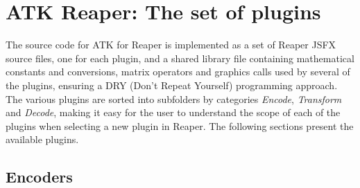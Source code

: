 \documentclass{article}
\begin{document}
\section{ATK Reaper: The set of plugins}\label{sec:implementation}

The source code for ATK for Reaper is implemented as a set of Reaper JSFX source files, one for each plugin, and a shared library file containing mathematical constants and conversions, matrix operators and graphics calls used by several of the plugins, ensuring a DRY (Don't Repeat Yourself) programming approach.
The various plugins are sorted into subfolders by categories \emph{Encode}, \emph{Transform} and \emph{Decode}, making it easy for the user to understand the scope of each of the plugins when selecting a new plugin in Rea\-per. 
The following sections present the available plugins.


\subsection{Encoders}\label{sec:encoders}
\end{document}
